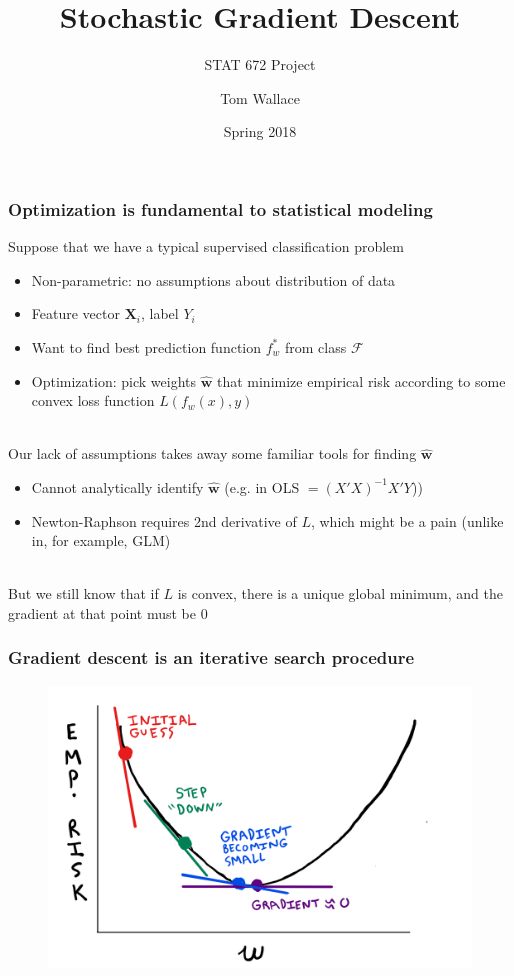 \documentclass{beamer}
\title{Stochastic Gradient Descent}
\subtitle{STAT 672 Project}
\author{Tom Wallace}
\institute{George Mason University}
\date{Spring 2018}
\begin{document}
\frame{\titlepage}


\begin{frame}
	\frametitle{Optimization is fundamental to statistical modeling}
	Suppose that we have a typical supervised classification problem
	\begin{itemize}
		\item \small Non-parametric: no assumptions about distribution of data
		\item Feature vector $\mathbf{X}_i$, label $Y_i$
		\item Want to find best prediction function $f_w^*$ from class $\mathcal{F}$
		\item Optimization: pick weights $\hat{\bm{w}}$ that minimize
			empirical risk according to some convex
			loss function $L(f_w(x), y)$ \\~\\
	\end{itemize}

	Our lack of assumptions takes away some familiar tools for finding $\hat{\mathbf{w}}$
	\begin{itemize}
		\item \small Cannot analytically identify $\hat{\mathbf{w}}$
			(e.g. in OLS $=(X'X)^{-1}X'Y$))
		\item \small Newton-Raphson requires 2nd derivative of $L$,
			which might be a pain (unlike in, for example, GLM)\\~\\
	\end{itemize}

	But we still know that if $L$ is convex, there is a unique global
	minimum, and the gradient at that point must be 0
\end{frame}

\begin{frame}
	\frametitle{Gradient descent is an iterative search procedure}
	\begin{figure}[h]
	\centering
	\includegraphics[scale=0.33]{Sketch}
	\end{figure}
\end{frame}
\end{document}
